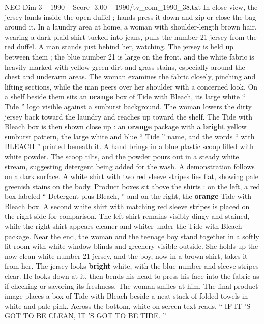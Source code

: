 \begin{textsample}{NEG Dim 3 – 1990 – Score -3.00 – 1990/tv\_com\_1990\_38.txt}
In close view, the jersey lands inside the open duffel ; hands press it down and zip or close the bag around it.
In a laundry area at home, a woman with shoulder-length brown hair, wearing a dark plaid shirt tucked into jeans, pulls the number 21 jersey from the red duffel.
A man stands just behind her, watching.
The jersey is held up between them ; the blue number 21 is large on the front, and the white fabric is heavily marked with yellow-green dirt and grass stains, especially around the chest and underarm areas.
The woman examines the fabric closely, pinching and lifting sections, while the man peers over her shoulder with a concerned look.
On a shelf beside them sits an \textbf{orange} box of Tide with Bleach, its large white “ Tide ” logo visible against a sunburst background.
The woman lowers the dirty jersey back toward the laundry and reaches up toward the shelf.
The Tide with Bleach box is then shown close up : an \textbf{orange} package with a \textbf{bright} yellow sunburst pattern, the large white and blue “ Tide ” name, and the words “ with BLEACH ” printed beneath it.
A hand brings in a blue plastic scoop filled with white powder.
The scoop tilts, and the powder pours out in a steady white stream, suggesting detergent being added for the wash.
A demonstration follows on a dark surface.
A white shirt with two red sleeve stripes lies flat, showing pale greenish stains on the body.
Product boxes sit above the shirts : on the left, a red box labeled “ Detergent plus Bleach, ” and on the right, the \textbf{orange} Tide with Bleach box.
A second white shirt with matching red sleeve stripes is placed on the right side for comparison.
The left shirt remains visibly dingy and stained, while the right shirt appears cleaner and whiter under the Tide with Bleach package.
Near the end, the woman and the teenage boy stand together in a softly lit room with white window blinds and greenery visible outside.
She holds up the now-clean white number 21 jersey, and the boy, now in a brown shirt, takes it from her.
The jersey looks \textbf{bright} white, with the blue number and sleeve stripes clear.
He looks down at it, then bends his head to press his face into the fabric as if checking or savoring its freshness.
The woman smiles at him.
The final product image places a box of Tide with Bleach beside a neat stack of folded towels in white and pale pink.
Across the bottom, white on-screen text reads, “ IF IT ’S GOT TO BE CLEAN, IT ’S GOT TO BE TIDE. ”

\end{textsample}
